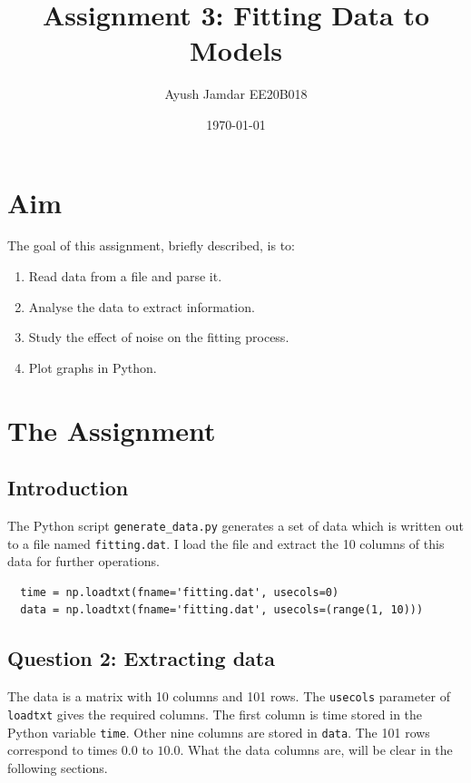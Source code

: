 \documentclass[11pt, a4paper]{article}
\title{Assignment 3: Fitting Data to Models} %
\author{Ayush Jamdar EE20B018} %
\date{\today} %
\begin{document}
		
		
\maketitle %
\section{Aim}

The goal of this assignment, briefly described, is to: 
\begin{enumerate}
  \item Read data from a file and parse it.
  \item Analyse the data to extract information.
  \item Study the effect of noise on the fitting process.
  \item Plot graphs in Python.
\end{enumerate}

\section{The Assignment}

 \subsection{Introduction}
 The Python script \texttt{generate\_data.py} generates a set of data which is written out to a file named \texttt{fitting.dat}. I load the file and extract the 10 columns of this data for further operations.
 \begin{verbatim}
  time = np.loadtxt(fname='fitting.dat', usecols=0)
  data = np.loadtxt(fname='fitting.dat', usecols=(range(1, 10)))
 \end{verbatim}
  
  \subsection{Question 2: Extracting data}
  The data is a matrix with 10 columns and 101 rows. The \texttt{usecols} parameter of \texttt{loadtxt} gives the required columns. The first column is time stored in the Python variable \texttt{time}. Other nine columns are stored in \texttt{data}. The 101 rows correspond to times $0.0$ to $10.0$. What the data columns are, will be clear in the following sections.
  
\end{document}
